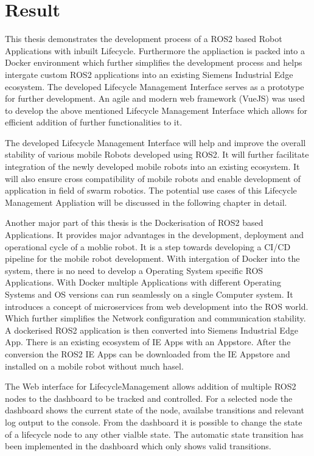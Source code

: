 \chapter{Result}
\label{Result}
	This thesis demonstrates the development process of a ROS2 based Robot Applications with inbuilt Lifecycle. Furthermore the appliaction is packed into a Docker environment which further simplifies the development process and helps intergate custom ROS2 applications into an existing Siemens Industrial Edge ecosystem. The developed Lifecycle Management Interface serves as a prototype for further development. An agile and modern web framework (VueJS) was used to develop the above mentioned Lifecycle Management Interface which allows for efficient addition of further functionalities to it.  

	
    The developed Lifecycle Management Interface will help and improve the overall stability of various mobile Robots developed using ROS2. It will further facilitate integration of the newly developed mobile robots into an existing ecosystem. It will also ensure cross compatibility of mobile robots and enable development of application in field of swarm robotics. The potential use cases of this Lifecycle Management Appliation will be discussed in the following chapter in detail.
    

    Another major part of this thesis is the Dockerisation of ROS2 based Applications. It provides major advantages in the development, deployment and operational cycle of a moblie robot. It is a step towards developing a CI/CD pipeline for the mobile robot development. With intergation of Docker into the system, there is no need to develop a Operating System specific ROS Applications. With Docker multiple Applications with different Operating Systems and OS versions can run seamlessly on a single Computer system. It introduces a concept of microservices from web development into the ROS world. Which further simplifies the Network configuration and communication stability. A dockerised ROS2 application is then converted into Siemens Industrial Edge App. There is an existing ecosystem of IE Apps with an Appstore. After the conversion the ROS2 IE Apps can be downloaded from the IE Appstore and installed on a mobile robot without much hasel. 

    
    The Web interface for LifecycleManagement allows addition of multiple ROS2 nodes to the dashboard to be tracked and controlled. For a selected node the dashboard shows the current state of the node, availabe transitions and relevant log output to the console. From the dashboard it is possible to change the state of a lifecycle node to any other vialble state. The automatic state transition has been implemented in the dashboard which only shows valid transitions.
